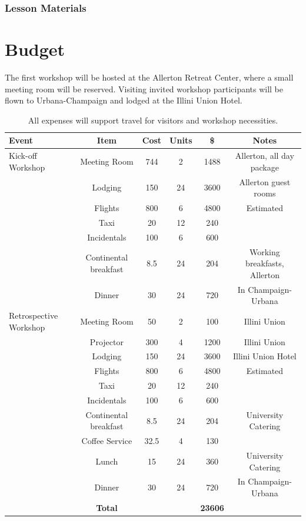 \documentclass[11pt]{article}
\begin{document}
          \subsubsection{Lesson Materials}


          \section{Budget}
          The first workshop will be hosted at the Allerton Retreat Center, 
          where a small meeting room will be reserved. Visiting 
          invited workshop participants will be flown to Urbana-Champaign and 
          lodged at the Illini Union Hotel.

\begin{table}[h!]
        \begin{tabularx}{\textwidth}{| X |c|c|c|c|c|}
        \hline
        \textbf{Event} & \textbf{Item} & \textbf{Cost} & \textbf{Units} & \textbf{\$} & \textbf{Notes}\\ 
        \hline
Kick-off Workshop&Meeting Room&744&2&1488&Allerton, all day package\\
&Lodging&150&24&3600&Allerton guest rooms\\
&Flights&800&6&4800&Estimated\\
&Taxi&20&12&240&\\
&Incidentals&100&6&600&\\
&Continental breakfast&8.5&24&204&Working breakfasts, Allerton\\
&Dinner&30&24&720&In Champaign-Urbana\\
\hline
Retrospective Workshop&Meeting Room&50&2&100&Illini Union\\
&Projector&300&4&1200&Illini Union\\
&Lodging&150&24&3600&Illini Union Hotel\\
&Flights&800&6&4800&Estimated\\
&Taxi&20&12&240&\\
&Incidentals&100&6&600&\\
&Continental breakfast&8.5&24&204&University Catering\\
&Coffee Service&32.5&4&130&\\
&Lunch&15&24&360&University Catering\\
&Dinner&30&24&720&In Champaign-Urbana\\
        \hline
        &\textbf{Total}&&&\textbf{23606}&\\
        \hline
\end{tabularx}
\caption{All expenses will support travel for visitors and workshop 
necessities.}
\end{table}
\end{document}
